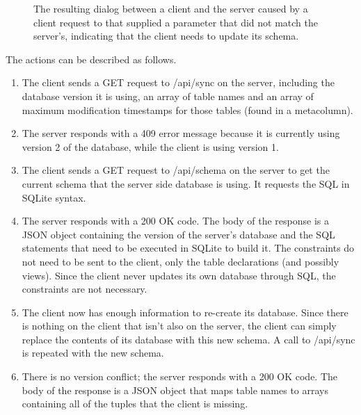 \begin{figure}[h!]
\begin{tikzpicture}[node distance = 2cm, auto, scale=.7, every node/.style={transform shape}]
\end{tikzpicture}
\caption{The resulting dialog between a client and the server caused by a client
request to \sync that supplied a  parameter that did not match the
server's, indicating that the client needs to update its schema.}
\label{fig:protocol}
\end{figure}

The actions can be described as follows. 

\begin{enumerate}

\item The client sends a GET request to /api/sync on the server, including the database version it is using, an array of table names and an array of maximum modification timestamps for those tables (found in a metacolumn).

\item The server responds with a 409 error message because it is currently using version 2 of the database, while the client is using version 1.

\item The client sends a GET request to /api/schema on the server to get the current schema that the server side database is using. It requests the SQL in SQLite syntax.

\item The server responds with a 200 OK code. The body of the response is a JSON object containing the version of the server's database and the SQL statements that need to be executed in SQLite to build it. The constraints do not need to be sent to the client, only the table declarations (and possibly views). Since the client never updates its own database through SQL, the constraints are not necessary. 

\item The client now has enough information to re-create its database. Since there is nothing on the client that isn't also on the server, the client can simply replace the contents of its database with this new schema. A call to /api/sync is repeated with the new schema. 

\item There is no version conflict; the server responds with a 200 OK code. The body of the response is a JSON object that maps table names to arrays containing all of the tuples that the client is missing. 

\end{enumerate}


